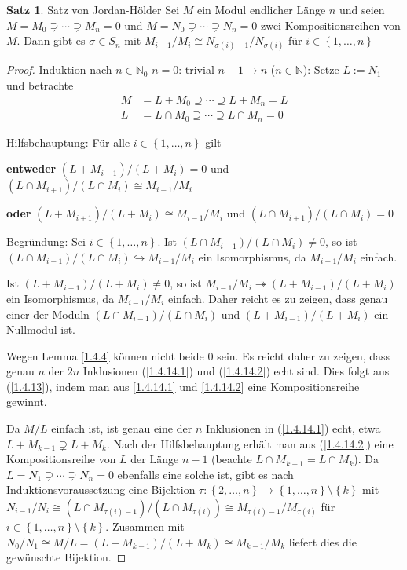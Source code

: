 \documentclass[
twoside=semi,
fontsize=12,
DIV=12, 
cleardoublepage=current,
leqno,
headings=optiontoheadandtoc, 
toc=idx
]{scrbook}
\newcommand{\N}{\mathbb{N}}
\newcommand{\set}[1]{\left\{ #1 \right\}}
\theoremstyle{definition}
\newtheorem{satz}[definition]{Satz}
\begin{document}
	\begin{satz}\label{1.4.14}
		Satz von Jordan-H\"older\newline
		Sei $M$ ein Modul endlicher L\"ange $n$ und seien $M = M_0 \supsetneq \cdots \supsetneq M_n = 0$ und $M = N_0 \supsetneq \cdots \supsetneq N_n = 0$ zwei Kompositionsreihen von $M$. Dann gibt es 
		$\sigma \in S_n$ mit $M_{i-1}/M_i \cong N_{\sigma(i)-1}/N_{\sigma(i)}$ f\"ur $i \in \set{1, \dots, n}$
		
		\begin{proof}
			Induktion nach $n \in \N_0$\newline
			$n = 0$: trivial\newline
			$n-1 \rightarrow n$ ($n \in \N$): Setze $L:=N_1$ und betrachte 
				\begin{align}
					M &= L + M_0 \supseteq \cdots \supseteq L + M_n = L \label{1.4.14.1}\\
					L &= L \cap M_0 \supseteq \cdots \supseteq L \cap M_n = 0 \label{1.4.14.2}
				\end{align}
			
			\noindent Hilfsbehauptung: F\"ur alle $i \in \set{1, \dots, n}$ gilt 
			
			\textbf{entweder} $(L+M_{i+1})/(L+M_i) = 0$ und $(L\cap M_{i+1})/(L\cap M_i) \cong M_{i-1}/M_i$
			
			\textbf{oder} $(L+M_{i+1})/(L+M_i) \cong M_{i-1}/M_i$ und $(L\cap M_{i+1})/(L\cap M_i) = 0$
			
			\noindent Begr\"undung: Sei $i \in \set{1, \dots, n}$. Ist $(L\cap M_{i-1})/(L\cap M_i) \neq 0$, so ist $(L\cap M_{i-1})/(L\cap M_i) \hookrightarrow M_{i-1}/M_i$
			ein Isomorphismus, da $M_{i-1}/M_i$ einfach.
			
			\noindent Ist $(L+M_{i-1})/(L+M_i) \neq 0$, so ist $M_{i-1}/M_i \twoheadrightarrow (L+M_{i-1})/(L+M_i)$ ein Isomorphismus, da $M_{i-1}/M_i$ einfach. Daher reicht es zu zeigen, dass genau einer der Moduln $(L\cap M_{i-1})/(L\cap M_i)$ und $(L+M_{i-1})/(L+M_i)$ ein Nullmodul ist.
			
			\noindent Wegen Lemma \ref{1.4.4} k\"onnen nicht beide $0$ sein. Es reicht daher zu zeigen, dass genau $n$ der $2n$ Inklusionen (\ref{1.4.14.1}) und (\ref{1.4.14.2}) echt sind. Dies folgt aus (\ref{1.4.13}), indem man aus \ref{1.4.14.1} und \ref{1.4.14.2} eine Kompositionsreihe gewinnt.
			
			\noindent Da $M/L$ einfach ist, ist genau eine der $n$ Inklusionen in (\ref{1.4.14.1}) echt, etwa $L+M_{k-1} \supsetneq L + M_k$. Nach der Hilfsbehauptung erh\"alt man aus (\ref{1.4.14.2}) eine Kompositionsreihe von $L$ der L\"ange $n-1$ (beachte $L\cap M_{k-1} = L\cap M_k$). Da $L=N_1\supsetneq \cdots \supsetneq N_n = 0$ ebenfalls eine solche ist, gibt es nach Induktionsvoraussetzung eine Bijektion $\tau: \set{2, \dots, n} \to \set{1, \dots, n} \setminus \set{k}$ mit $N_{i-1}/N_i \cong (L\cap M_{\tau(i)-1})/(L\cap M_{\tau(i)}) \cong M_{\tau(i)-1} / M_{\tau(i)}$ f\"ur $i \in \set{1,\dots, n}\setminus \set{k}$. Zusammen mit $N_0/N_1 \cong M/L = (L+M_{k-1})/(L+M_k) \cong M_{k-1}/M_k$ liefert dies die gew\"unschte Bijektion.
		\end{proof}
	\end{satz}
\end{document}
